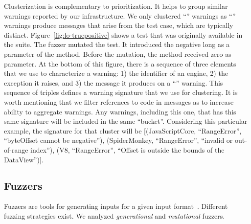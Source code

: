 \documentclass[smallextended]{svjour3}
\begin{document}
Clusterization is complementary to prioritization. It helps to group
similar warnings reported by our infrastructure. We only clustered
``\lo'' warnings as ``\hi'' warnings produce messages that arise from
the test case, which are typically distinct.
Figure~\ref{fig:lo-truepositive} shows a test that was originally
available in the \jsc suite. The \radamsa fuzzer mutated the test. It
introduced the negative long  as a
parameter of the  method. Before the mutation,
the  method received zero as parameter.  At the
bottom of this figure, there is a sequence of three elements that we
use to characterize a warning: 1) the identifier of an engine, 2) the
exception it raises, and 3) the message it produces on a ``\lo''
warning.  This sequence of triples defines a warning signature that we
use for clustering. It is worth mentioning that we filter references
to code in messages as to increase ability to aggregate warnings. Any
warnings, including this one, that has this same signature will be
included in the same ``bucket''. Considering this particular example,
the signature for that cluster will be [(JavaScriptCore,
  ``RangeError'', ``byteOffset cannot be negative''), (SpiderMonkey,
  ``RangeError'', ``invalid or out-of-range index''), (V8,
  ``RangeError'', ``Offset is outside the bounds of the DataView'')].


\subsection{Fuzzers}
\label{sec:objects:fuzzers}


Fuzzers are tools for generating inputs for a given input
format~\cite{8863940}. Different fuzzing strategies exist. We analyzed
\emph{generational} and \emph{mutational} fuzzers.
\end{document}
